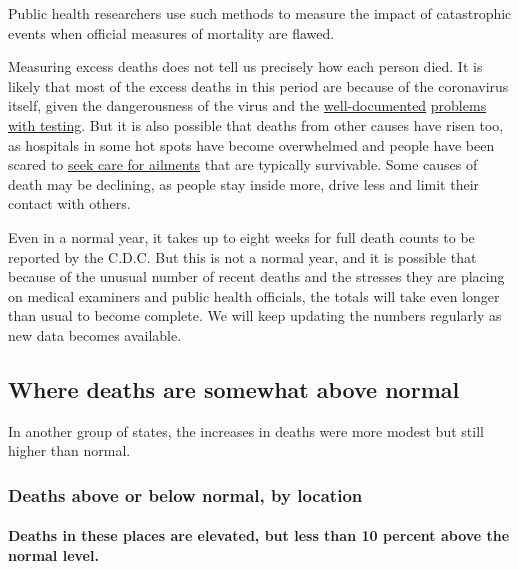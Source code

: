 Public health researchers use such methods to measure the impact of
catastrophic events when official measures of mortality are flawed.

Measuring excess deaths does not tell us precisely how each person died.
It is likely that most of the excess deaths in this period are because
of the coronavirus itself, given the dangerousness of the virus and the
\href{https://www.nytimes.com/2020/04/18/health/cdc-coronavirus-lab-contamination-testing.html}{well-documented}
\href{https://www.nytimes.com/2020/04/15/us/coronavirus-testing-trump.html}{problems}
\href{https://www.nytimes.com/2020/03/28/us/testing-coronavirus-pandemic.html}{with
testing}. But it is also possible that deaths from other causes have
risen too, as hospitals in some hot spots have become overwhelmed and
people have been scared to
\href{https://www.nytimes.com/2020/04/06/well/live/coronavirus-doctors-hospitals-emergency-care-heart-attack-stroke.html}{seek
care for ailments} that are typically survivable. Some causes of death
may be declining, as people stay inside more, drive less and limit their
contact with others.

Even in a normal year, it takes up to eight weeks for full death counts
to be reported by the C.D.C. But this is not a normal year, and it is
possible that because of the unusual number of recent deaths and the
stresses they are placing on medical examiners and public health
officials, the totals will take even longer than usual to become
complete. We will keep updating the numbers regularly as new data
becomes available.

\hypertarget{where-deaths-are-somewhat-above-normal}{%
\subsection{Where deaths are somewhat above
normal}\label{where-deaths-are-somewhat-above-normal}}

In another group of states, the increases in deaths were more modest but
still higher than normal.

\hypertarget{deaths-above-or-below-normal-by-location-1}{%
\subsubsection{Deaths above or below normal, by
location}\label{deaths-above-or-below-normal-by-location-1}}

\hypertarget{deaths-in-these-places-are-elevated-but-less-than-10-percent-above-the-normal-level}{%
\paragraph{Deaths in these places are elevated, but less than 10 percent
above the normal
level.}\label{deaths-in-these-places-are-elevated-but-less-than-10-percent-above-the-normal-level}}

